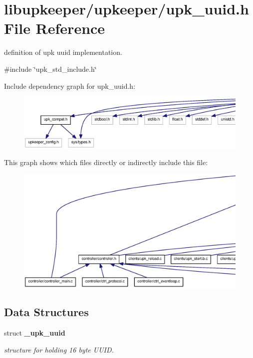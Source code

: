 \section{libupkeeper/upkeeper/upk\_\-uuid.h File Reference}
\label{upk__uuid_8h}


definition of upk uuid implementation.  


{\ttfamily \#include \char`\"{}upk\_\-std\_\-include.h\char`\"{}}\par
Include dependency graph for upk\_\-uuid.h:
\nopagebreak
\begin{figure}[H]
\begin{center}
\leavevmode
\includegraphics[width=400pt]{upk__uuid_8h__incl}
\end{center}
\end{figure}
This graph shows which files directly or indirectly include this file:\nopagebreak
\begin{figure}[H]
\begin{center}
\leavevmode
\includegraphics[width=400pt]{upk__uuid_8h__dep__incl}
\end{center}
\end{figure}
\subsection*{Data Structures}
\begin{DoxyCompactItemize}
\item 
struct {\bf \_\-upk\_\-uuid}
\begin{DoxyCompactList}\small\item\em structure for holding 16 byte UUID. \end{DoxyCompactList}\end{DoxyCompactItemize}

